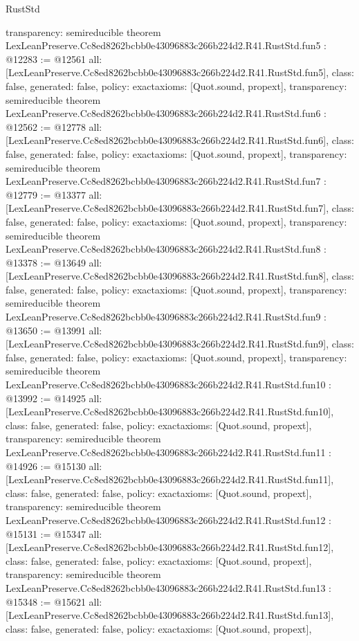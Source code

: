 \begin{lexlean}{RustStd}
\begin{coremodule}
{  transparency: semireducible
}
theorem LexLeanPreserve.Cc8ed8262bcbb0e43096883c266b224d2.R41.RustStd.fun5 : @12283 := @12561 {
  all: [LexLeanPreserve.Cc8ed8262bcbb0e43096883c266b224d2.R41.RustStd.fun5],
  class: false,
  generated: false,
  policy: exact{axioms: [Quot.sound, propext]},
  transparency: semireducible
}
theorem LexLeanPreserve.Cc8ed8262bcbb0e43096883c266b224d2.R41.RustStd.fun6 : @12562 := @12778 {
  all: [LexLeanPreserve.Cc8ed8262bcbb0e43096883c266b224d2.R41.RustStd.fun6],
  class: false,
  generated: false,
  policy: exact{axioms: [Quot.sound, propext]},
  transparency: semireducible
}
theorem LexLeanPreserve.Cc8ed8262bcbb0e43096883c266b224d2.R41.RustStd.fun7 : @12779 := @13377 {
  all: [LexLeanPreserve.Cc8ed8262bcbb0e43096883c266b224d2.R41.RustStd.fun7],
  class: false,
  generated: false,
  policy: exact{axioms: [Quot.sound, propext]},
  transparency: semireducible
}
theorem LexLeanPreserve.Cc8ed8262bcbb0e43096883c266b224d2.R41.RustStd.fun8 : @13378 := @13649 {
  all: [LexLeanPreserve.Cc8ed8262bcbb0e43096883c266b224d2.R41.RustStd.fun8],
  class: false,
  generated: false,
  policy: exact{axioms: [Quot.sound, propext]},
  transparency: semireducible
}
theorem LexLeanPreserve.Cc8ed8262bcbb0e43096883c266b224d2.R41.RustStd.fun9 : @13650 := @13991 {
  all: [LexLeanPreserve.Cc8ed8262bcbb0e43096883c266b224d2.R41.RustStd.fun9],
  class: false,
  generated: false,
  policy: exact{axioms: [Quot.sound, propext]},
  transparency: semireducible
}
theorem LexLeanPreserve.Cc8ed8262bcbb0e43096883c266b224d2.R41.RustStd.fun10 : @13992 := @14925 {
  all: [LexLeanPreserve.Cc8ed8262bcbb0e43096883c266b224d2.R41.RustStd.fun10],
  class: false,
  generated: false,
  policy: exact{axioms: [Quot.sound, propext]},
  transparency: semireducible
}
theorem LexLeanPreserve.Cc8ed8262bcbb0e43096883c266b224d2.R41.RustStd.fun11 : @14926 := @15130 {
  all: [LexLeanPreserve.Cc8ed8262bcbb0e43096883c266b224d2.R41.RustStd.fun11],
  class: false,
  generated: false,
  policy: exact{axioms: [Quot.sound, propext]},
  transparency: semireducible
}
theorem LexLeanPreserve.Cc8ed8262bcbb0e43096883c266b224d2.R41.RustStd.fun12 : @15131 := @15347 {
  all: [LexLeanPreserve.Cc8ed8262bcbb0e43096883c266b224d2.R41.RustStd.fun12],
  class: false,
  generated: false,
  policy: exact{axioms: [Quot.sound, propext]},
  transparency: semireducible
}
theorem LexLeanPreserve.Cc8ed8262bcbb0e43096883c266b224d2.R41.RustStd.fun13 : @15348 := @15621 {
  all: [LexLeanPreserve.Cc8ed8262bcbb0e43096883c266b224d2.R41.RustStd.fun13],
  class: false,
  generated: false,
  policy: exact{axioms: [Quot.sound, propext]},
}
\end{coremodule}
\end{lexlean}
